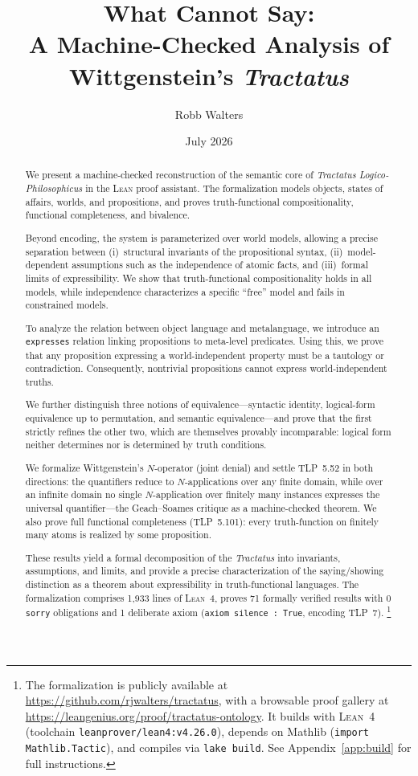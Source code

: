\documentclass[10pt, letterpaper]{article}
\title{What \Lean{} Cannot Say:\\
A Machine-Checked Analysis of Wittgenstein's \emph{Tractatus}}
\author{Robb Walters}
\date{July 2026}
\theoremstyle{definition}
\theoremstyle{remark}
\newcommand{\Lean}{\textsc{Lean}}
\begin{document}
\maketitle

\begin{abstract}
We present a machine-checked reconstruction of the semantic core
of \emph{Tractatus Logico-Philosophicus} in the \Lean{} proof
assistant.  The formalization models objects, states of affairs,
worlds, and propositions, and proves truth-functional
compositionality, functional completeness, and bivalence.

Beyond encoding, the system is parameterized over world models,
allowing a precise separation between (i)~structural invariants
of the propositional syntax, (ii)~model-dependent assumptions
such as the independence of atomic facts, and (iii)~formal limits
of expressibility.  We show that truth-functional compositionality
holds in all models, while independence characterizes a specific
``free'' model and fails in constrained models.

To analyze the relation between object language and metalanguage,
we introduce an \texttt{expresses} relation linking propositions
to meta-level predicates.  Using this, we prove that any
proposition expressing a world-independent property must be a
tautology or contradiction.  Consequently, nontrivial propositions
cannot express world-independent truths.

We further distinguish three notions of
equivalence---syntactic identity, logical-form equivalence up to
permutation, and semantic equivalence---and prove that the first
strictly refines the other two, which are themselves provably
incomparable: logical form neither determines nor is determined
by truth conditions.

We formalize Wittgenstein's $N$-operator (joint denial) and
settle TLP~5.52 in both directions: the quantifiers reduce to
$N$-applications over any finite domain, while over an infinite
domain no single $N$-application over finitely many instances
expresses the universal quantifier---the Geach--Soames critique
as a machine-checked theorem.  We also prove full functional
completeness (TLP~5.101): every truth-function on finitely many
atoms is realized by some proposition.

These results yield a formal decomposition of the \emph{Tractatus}
into invariants, assumptions, and limits, and provide a precise
characterization of the saying/showing distinction as a theorem
about expressibility in truth-functional languages.
The formalization comprises 1,933 lines of \Lean~4, proves 71
formally verified results with 0 \texttt{sorry} obligations
and 1 deliberate axiom (\texttt{axiom silence : True}, encoding
TLP~7).%
\footnote{The formalization is publicly available at
  \url{https://github.com/rjwalters/tractatus},
  with a browsable proof gallery at
  \url{https://leangenius.org/proof/tractatus-ontology}.
  It builds with \Lean~4 (toolchain \texttt{leanprover/lean4:v4.26.0}),
  depends on Mathlib (\texttt{import Mathlib.Tactic}), and compiles via
  \texttt{lake build}.  See Appendix~\ref{app:build} for full
  instructions.}
\end{abstract}
\end{document}
